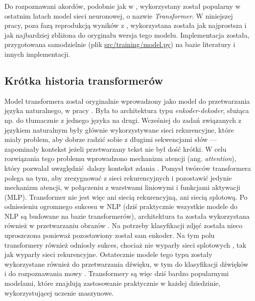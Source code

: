 Do rozpoznawani akordów, podobnie jak w \cite{park_bi-directional_2019}, wykorzystany został
popularny w ostatnim latach model sieci neuronowej, o nazwie \emph{Transformer}. W niniejszej pracy,
poza fazą reprodukcją wyników z \cite{park_bi-directional_2019}, wykorzystana została jak
najprostsza i jak najbardziej zbliżona do oryginału wersja tego modelu. Implementacja została,
przygotowana samodzielnie (plik \url{src/training/model.py}) na bazie literatury i innych
implementacji.


\subsection{Krótka historia transformerów}

Model transformera został oryginalnie wprowadzony jako model do przetwarzania języka naturalnego, w
pracy \cite{vaswani_attention_2017}. Była to architektura typu \emph{enkoder-dekoder}, służąca np.
do tłumacznie z jednego języka na drugi. Wcześniej do zadań związanych z językiem naturalnym były
głównie wykorzystywane sieci rekurencyjne, które miały problem, aby dobrze radzić sobie z długimi
sekwencjami słów --- zapominały kontekst jeżeli przetwarzany tekst nie był dość krótki. W celu
rozwiązania tego problemu wprowadzono mechanizm atencji (ang. \emph{attention}), który pozwalał
uwzględnić dalszy kontekst zdania \cite{bahdanau_neural_2016}. Pomysł twórców transformera polega na
tym, aby zrezygnować z sieci rekurencyjnych i pozostawić jedynie mechanizm atencji, w połączeniu z
warstwami liniowymi i funkcjami aktywacji (MLP). Transformer nie jest więc ani siecią rekurencyjną,
ani siecią splotową. Po odniesieniu ogromnego sukcesu w NLP (dziś praktycznie wszystkie modele do
NLP są budowane na bazie transformerów), architektura ta została wykorzystana również w
przetwarzaniu obrazów \cite{dosovitskiy_image_2021}. Na potrzeby klasyfikacji zdjęć została nieco
uproszczona ponieważ pozostawiony został sam enkoder. Na tym polu transformery również odniosły
sukces, chociaż nie wyparły sieci splotowych \cite{liu_convnet_2022}, tak jak wyparły sieci
rekurencyjne. Ostatecznie modele tego typu zostały wykorzystane również do przetwarzania dźwięku, w
tym do klasyfikacji dźwięków \cite{gong_ast_2021} i do rozpoznawania mowy
\cite{kim_squeezeformer_2022}. Transformery są więc dziś bardzo popularnymi modelami, które znajdują
zastosowanie praktycznie w każdej dziedzinie, wykorzystującej uczenie maszynowe.

